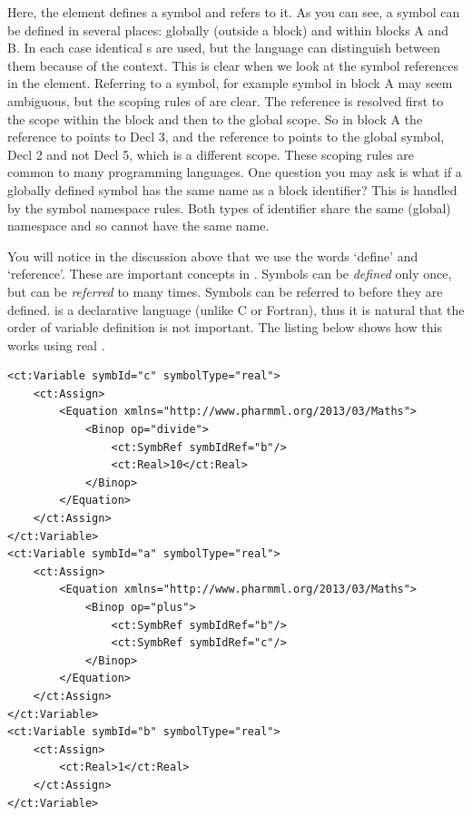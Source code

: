 Here, the  element defines a symbol and 
refers to it.  As you can see, a symbol can be defined in several
places: globally (outside a block) and within blocks A and B. In each
case identical s are used, but the language can
distinguish between them because of the context. This is clear when we
look at the symbol references in the 
element. Referring to a symbol, for example symbol  in
block A may seem ambiguous, but the scoping rules of \pharmml are
clear. The reference is resolved first to the scope within the block
and then to the global scope. So in block A the reference to
 points to Decl 3, and the reference to 
points to the global symbol, Decl 2 and not Decl 5, which is a
different scope. These scoping rules are common to many programming
languages. One question you may ask is what if a globally defined symbol
has the same name as a block identifier? This is handled by the
symbol namespace rules. Both types of identifier share the same (global)
namespace and so cannot have the same name.

You will notice in the discussion above that we use the words `define'
and `reference'. These are important concepts in \pharmml. Symbols can be
\emph{defined} only once, but can be \emph{referred} to many
times. Symbols can be referred to before they are defined. 
\pharmml is a declarative language (unlike C or Fortran), thus it is natural
that the order of variable definition is not important. The listing below
shows how this works using real \pharmml.

\lstset{language=XML}
\begin{lstlisting}
<ct:Variable symbId="c" symbolType="real">
    <ct:Assign>
        <Equation xmlns="http://www.pharmml.org/2013/03/Maths">
            <Binop op="divide">
                <ct:SymbRef symbIdRef="b"/>
                <ct:Real>10</ct:Real>
            </Binop>
        </Equation>
    </ct:Assign>
</ct:Variable>
<ct:Variable symbId="a" symbolType="real">
    <ct:Assign>
        <Equation xmlns="http://www.pharmml.org/2013/03/Maths">
            <Binop op="plus">
                <ct:SymbRef symbIdRef="b"/>
                <ct:SymbRef symbIdRef="c"/>
            </Binop>
        </Equation>
    </ct:Assign>
</ct:Variable>
<ct:Variable symbId="b" symbolType="real">
    <ct:Assign>
        <ct:Real>1</ct:Real>
    </ct:Assign>
</ct:Variable>
\end{lstlisting}

